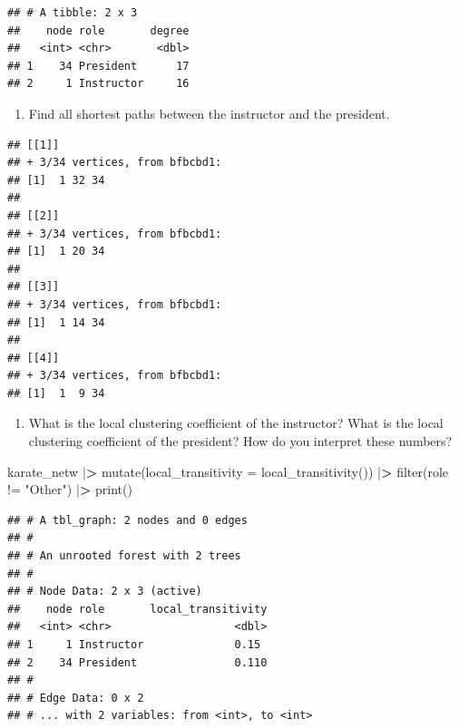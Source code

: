 \documentclass[
]{article}
\newenvironment{Shaded}{\begin{snugshade}}{\end{snugshade}}
\newcommand{\AttributeTok}[1]{\textcolor[rgb]{0.77,0.63,0.00}{#1}}
\newcommand{\DecValTok}[1]{\textcolor[rgb]{0.00,0.00,0.81}{#1}}
\newcommand{\ErrorTok}[1]{\textcolor[rgb]{0.64,0.00,0.00}{\textbf{#1}}}
\newcommand{\FunctionTok}[1]{\textcolor[rgb]{0.00,0.00,0.00}{#1}}
\newcommand{\NormalTok}[1]{#1}
\newcommand{\SpecialCharTok}[1]{\textcolor[rgb]{0.00,0.00,0.00}{#1}}
\newcommand{\StringTok}[1]{\textcolor[rgb]{0.31,0.60,0.02}{#1}}
\providecommand{\tightlist}{%
  \setlength{\itemsep}{0pt}\setlength{\parskip}{0pt}}
\begin{document}
\begin{verbatim}
## # A tibble: 2 x 3
##    node role       degree
##   <int> <chr>       <dbl>
## 1    34 President      17
## 2     1 Instructor     16
\end{verbatim}

\begin{enumerate}
\def\labelenumi{(\arabic{enumi})}
\setcounter{enumi}{5}
\tightlist
\item
  Find all shortest paths between the instructor and the president.
\end{enumerate}

\begin{Shaded}
\end{Shaded}

\begin{verbatim}
## [[1]]
## + 3/34 vertices, from bfbcbd1:
## [1]  1 32 34
## 
## [[2]]
## + 3/34 vertices, from bfbcbd1:
## [1]  1 20 34
## 
## [[3]]
## + 3/34 vertices, from bfbcbd1:
## [1]  1 14 34
## 
## [[4]]
## + 3/34 vertices, from bfbcbd1:
## [1]  1  9 34
\end{verbatim}

\begin{enumerate}
\def\labelenumi{(\arabic{enumi})}
\setcounter{enumi}{6}
\tightlist
\item
  What is the local clustering coefficient of the instructor? What is
  the local clustering coefficient of the president? How do you
  interpret these numbers?
\end{enumerate}

\begin{Shaded}
\begin{Highlighting}[]
\NormalTok{karate\_netw }\SpecialCharTok{|}\ErrorTok{\textgreater{}}
  \FunctionTok{mutate}\NormalTok{(}\AttributeTok{local\_transitivity =} \FunctionTok{local\_transitivity}\NormalTok{())  }\SpecialCharTok{|}\ErrorTok{\textgreater{}}
  \FunctionTok{filter}\NormalTok{(role }\SpecialCharTok{!=} \StringTok{"Other"}\NormalTok{) }\SpecialCharTok{|}\ErrorTok{\textgreater{}}
  \FunctionTok{print}\NormalTok{()}
\end{Highlighting}
\end{Shaded}

\begin{verbatim}
## # A tbl_graph: 2 nodes and 0 edges
## #
## # An unrooted forest with 2 trees
## #
## # Node Data: 2 x 3 (active)
##    node role       local_transitivity
##   <int> <chr>                   <dbl>
## 1     1 Instructor              0.15 
## 2    34 President               0.110
## #
## # Edge Data: 0 x 2
## # ... with 2 variables: from <int>, to <int>
\end{verbatim}
\end{document}
